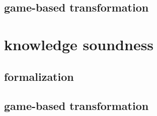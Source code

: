 \subsection{game-based transformation}


\section{knowledge soundness}

\subsection{formalization}

\subsection{game-based transformation}